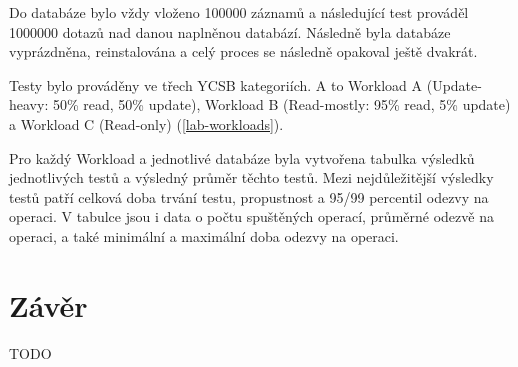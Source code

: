 \documentclass[czech,master,dept460,male,csharp,cpdeclaration]{diploma}
\begin{document}
	Do databáze bylo vždy vloženo 100000 záznamů a následující test prováděl 1000000 dotazů nad danou naplněnou databází. Následně byla databáze vyprázdněna, reinstalována a celý proces se následně opakoval ještě dvakrát.
	
	Testy bylo prováděny ve třech YCSB kategoriích. A to Workload A (Update-heavy: 50\% read, 50\% update), Workload B (Read-mostly: 95\% read, 5\% update) a Workload C (Read-only) (\ref{lab-workloads}).
	
	Pro každý Workload a jednotlivé databáze byla vytvořena tabulka výsledků jednotlivých testů a výsledný průměr těchto testů. Mezi nejdůležitější výsledky testů patří celková doba trvání testu, propustnost a 95/99 percentil odezvy na operaci. V tabulce jsou i data o počtu spuštěných operací, průměrné odezvě na operaci, a také minimální a maximální doba odezvy na operaci.
	
	\chapter{Závěr}
	
	TODO
		
	\nocite{*}
	
	\printbibliography[title={Literatura}, heading=bibintoc]
	
\end{document}
